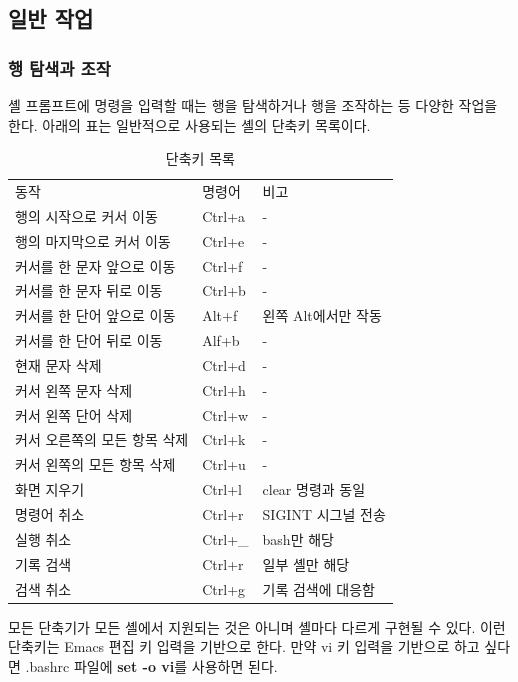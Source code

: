 \subsection*{일반 작업}
\subsubsection*{행 탐색과 조작}
\begin{flushleft}
    셸 프롬프트에 명령을 입력할 때는 행을 탐색하거나 행을 조작하는 등 다양한 작업을 한다.
    아래의 표는 일반적으로 사용되는 셸의 단축키 목록이다.
\end{flushleft}


\begin{table}[H]
    \everyrow{\hline}
    \begin{tabu}{|X[7]|X[3]|X[5]|}
        동작 & 명령어 & 비고 \\
        행의 시작으로 커서 이동 & Ctrl+a & - \\
        행의 마지막으로 커서 이동 & Ctrl+e & - \\
        커서를 한 문자 앞으로 이동 & Ctrl+f & - \\
        커서를 한 문자 뒤로 이동 & Ctrl+b & - \\
        커서를 한 단어 앞으로 이동 & Alt+f & 왼쪽 Alt에서만 작동 \\
        커서를 한 단어 뒤로 이동 & Alf+b & - \\
        현재 문자 삭제 & Ctrl+d & - \\
        커서 왼쪽 문자 삭제 & Ctrl+h & - \\
        커서 왼쪽 단어 삭제 & Ctrl+w & - \\
        커서 오른쪽의 모든 항목 삭제 & Ctrl+k & - \\
        커서 왼쪽의 모든 항목 삭제 & Ctrl+u & - \\
        화면 지우기 & Ctrl+l & clear 명령과 동일 \\
        명령어 취소 & Ctrl+r & SIGINT 시그널 전송 \\
        실행 취소 & Ctrl+\_ & bash만 해당 \\
        기록 검색 & Ctrl+r & 일부 셸만 해당 \\
        검색 취소 & Ctrl+g & 기록 검색에 대응함 \\
    \end{tabu}
    \caption{단축키 목록}
    \label{tab:shortcut}
\end{table}

\begin{flushleft}
    모든 단축기가 모든 셸에서 지원되는 것은 아니며 셸마다 다르게 구현될 수 있다.
    이런 단축키는 Emacs 편집 키 입력을 기반으로 한다.
    만약 vi 키 입력을 기반으로 하고 싶다면 .bashrc 파일에 \textbf{set -o vi}를 사용하면 된다.
\end{flushleft}

